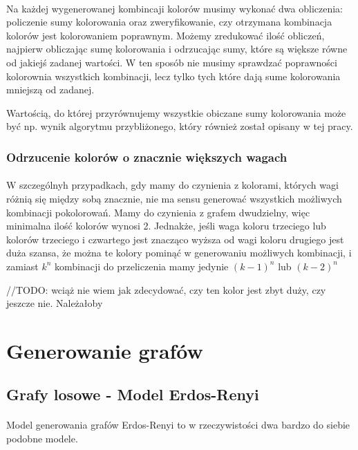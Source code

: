 \documentclass{article}
\begin{document}
\paragraph{} Na każdej wygenerowanej kombincaji kolorów musimy wykonać dwa obliczenia: policzenie sumy kolorowania oraz zweryfikowanie, czy otrzymana kombinacja kolorów jest kolorowaniem poprawnym. Możemy zredukować ilość obliczeń, najpierw obliczając sumę kolorowania i odrzucając sumy, które są większe równe od jakiejś zadanej wartości. W ten sposób nie musimy sprawdzać poprawności kolorownia wszystkich kombinacji, lecz tylko tych które dają sume kolorowania mniejszą od zadanej.

Wartością, do której przyrównujemy wszystkie obiczane sumy kolorowania może być np. wynik algorytmu przybliżonego, który również został opisany w tej pracy.

\subsubsection*{Odrzucenie kolorów o znacznie większych wagach}

\paragraph{} W szczególnyh przypadkach, gdy mamy do czynienia z kolorami, których wagi różnią się między sobą znacznie, nie ma sensu generować wszystkich możliwych kombinacji pokolorowań. Mamy do czynienia z grafem dwudzielny, więc minimalna ilość kolorów wynosi 2. Jednakże, jeśli waga koloru trzeciego lub kolorów trzeciego i czwartego jest znacząco wyższa od wagi koloru drugiego jest duża szansa, że można te kolory pominąć w generowaniu możliwych kombinacji, i zamiast $k^n$ kombinacji do przeliczenia mamy jedynie $(k-1)^n$ lub $(k-2)^n$

//TODO: wciąż nie wiem jak zdecydować, czy ten kolor jest zbyt duży, czy jeszcze nie. Należałoby 

\section{Generowanie grafów}

\subsection{Grafy losowe - Model Erdos-Renyi}

\paragraph{} Model generowania grafów Erdos-Renyi to w rzeczywistości dwa bardzo do siebie podobne modele. 
\end{document}
